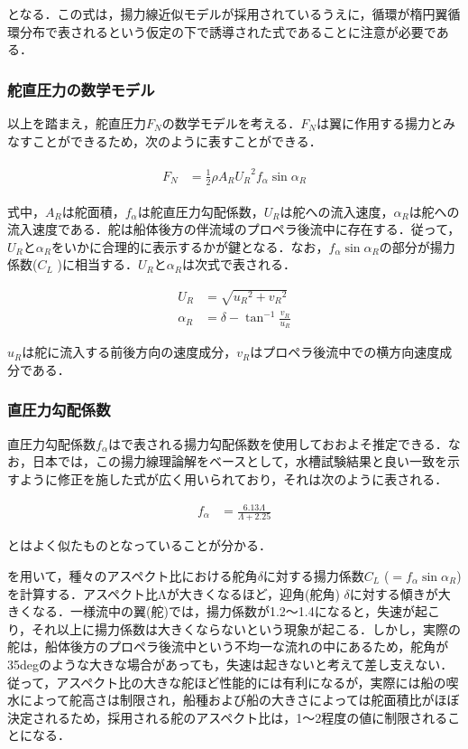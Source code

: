 となる．この式は，揚力線近似モデルが採用されているうえに，循環が楕円翼循環分布で表されるという仮定の下で誘導された式であることに注意が必要である．

\subsubsection{舵直圧力の数学モデル}

以上を踏まえ，舵直圧力$F_N$の数学モデルを考える．$F_N$は翼に作用する揚力とみなすことができるため，次のように表すことができる．

\begin{align}
    \begin{split}
        F_N &= \frac{1}{2} \rho A_R {U_R}^2 f_\alpha \sin{\alpha_R} \label{eq:2-34}
    \end{split}
\end{align}

式中，$A_R$は舵面積，$f_\alpha$は舵直圧力勾配係数，$U_R$は舵への流入速度，$\alpha_R$は舵への流入速度である．舵は船体後方の伴流域のプロペラ後流中に存在する．従って，$U_R$と$\alpha_R$をいかに合理的に表示するかが鍵となる．なお，$f_\alpha \sin{α_R} $の部分が揚力係数($C_L$ )に相当する．$U_R$と$\alpha_R$は次式で表される．

\begin{align}
    U_R &= \sqrt{{u_R}^2 + {v_R}^2} \label{eq:2-35} \\
    \alpha_R &= \delta - \tan^{-1}{\frac{v_R}{u_R}} \label{eq:2-36}
\end{align}

$u_R$は舵に流入する前後方向の速度成分，$v_R$はプロペラ後流中での横方向速度成分である．

\subsubsection{直圧力勾配係数}

直圧力勾配係数$f_\alpha$はで表される揚力勾配係数を使用しておおよそ推定できる．なお，日本では，この揚力線理論解をベースとして，水槽試験結果と良い一致を示すように修正を施した式が広く用いられており，それは次のように表される． 

\begin{align}
    f_\alpha &= \frac{6.13 \Lambda}{\Lambda + 2.25} \label{eq:2-37}
\end{align}

とはよく似たものとなっていることが分かる． 

を用いて，種々のアスペクト比における舵角$\delta$に対する揚力係数$C_L$ ($=f_\alpha \sin{\alpha_R} $)を計算する．アスペクト比Λが大きくなるほど，迎角(舵角) $\delta$に対する傾きが大きくなる．一様流中の翼(舵)では，揚力係数が1.2～1.4になると，失速が起こり，それ以上に揚力係数は大きくならないという現象が起こる．しかし，実際の舵は，船体後方のプロペラ後流中という不均一な流れの中にあるため，舵角が35degのような大きな場合があっても，失速は起きないと考えて差し支えない．従って，アスペクト比の大きな舵ほど性能的には有利になるが，実際には船の喫水によって舵高さは制限され，船種および船の大きさによっては舵面積比がほぼ決定されるため，採用される舵のアスペクト比は，1～2程度の値に制限されることになる．

